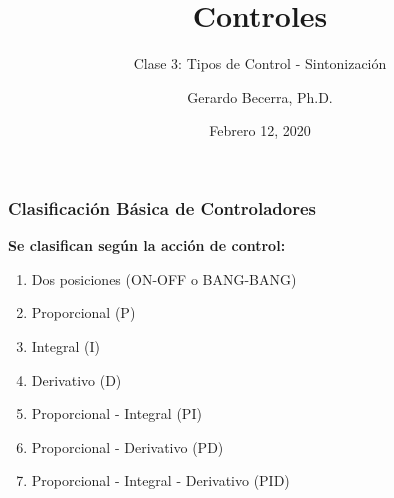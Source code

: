 \documentclass[aspectratio=169,handout]{beamer}
\title{Controles}
\subtitle{\small Clase 3: Tipos de Control - Sintonización}
\author{Gerardo Becerra, Ph.D.}
\institute{Pontificia Universidad Javeriana\\ Departamento de Electrónica}
\date{Febrero 12, 2020}
\theoremstyle{definition}
\theoremstyle{plain}
\theoremstyle{remark}
\begin{document}
\frame{\titlepage}	


\begin{frame}[<+->]\frametitle{Clasificación Básica de Controladores}
\textbf{Se clasifican según la acción de control:}\\
\begin{enumerate}
  \item Dos posiciones (ON-OFF o BANG-BANG)
  \item Proporcional (P)
  \item Integral (I)
  \item Derivativo (D)
  \item Proporcional - Integral (PI)
  \item Proporcional - Derivativo (PD)
  \item Proporcional - Integral - Derivativo (PID)
\end{enumerate}
\end{frame}
\end{document}
